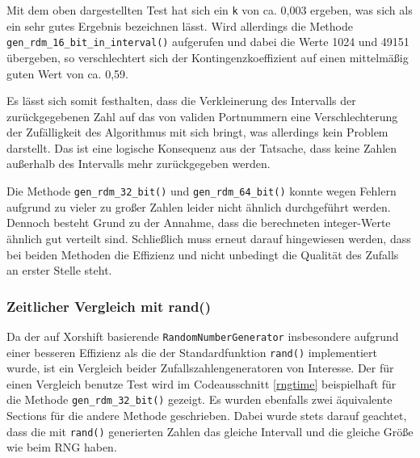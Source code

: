 \documentclass[../review_3.tex]{subfiles}
\begin{document}
Mit dem oben dargestellten Test hat sich ein \texttt{k} von ca. 0,003 ergeben, was sich als ein sehr gutes Ergebnis bezeichnen lässt. Wird allerdings die Methode \texttt{gen\_rdm\_16\_bit\_in\_interval()} aufgerufen und dabei die Werte 1024 und 49151 übergeben, so verschlechtert sich der Kontingenzkoeffizient auf einen mittelmäßig guten Wert von ca. 0,59.

Es lässt sich somit festhalten, dass die Verkleinerung des Intervalls der zurückgegebenen Zahl auf das von validen Portnummern eine Verschlechterung der Zufälligkeit des Algorithmus mit sich bringt, was allerdings kein Problem darstellt. Das ist eine logische Konsequenz aus der Tatsache, dass keine Zahlen außerhalb des Intervalls mehr zurückgegeben werden.

Die Methode \texttt{gen\_rdm\_32\_bit()} und \texttt{gen\_rdm\_64\_bit()} konnte wegen Fehlern aufgrund zu vieler zu großer Zahlen leider nicht ähnlich durchgeführt werden. Dennoch besteht Grund zu der Annahme, dass die berechneten integer-Werte ähnlich gut verteilt sind. Schließlich muss erneut darauf hingewiesen werden, dass bei beiden Methoden die Effizienz und nicht unbedingt die Qualität des Zufalls an erster Stelle steht.

\subsubsection{Zeitlicher Vergleich mit rand()}
Da der auf Xorshift basierende \texttt{RandomNumberGenerator} insbesondere aufgrund einer besseren Effizienz als die der Standardfunktion \texttt{rand()} implementiert wurde, ist ein Vergleich beider Zufallszahlengeneratoren von Interesse. Der für einen Vergleich benutze Test wird im Codeausschnitt \ref{rngtime} beispielhaft für die Methode \texttt{gen\_rdm\_32\_bit()} gezeigt. Es wurden ebenfalls zwei äquivalente Sections für die andere Methode geschrieben. Dabei wurde stets darauf geachtet, dass die mit \texttt{rand()} generierten Zahlen das gleiche Intervall und die gleiche Größe wie beim RNG haben.
\end{document}
